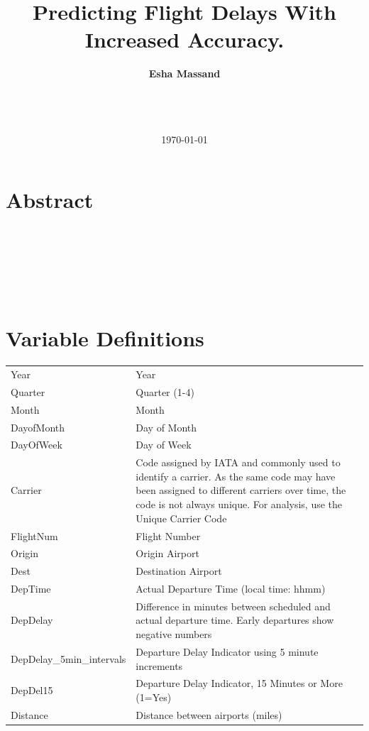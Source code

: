 \documentclass[a4paper, 11pt]{article}
\begin{document}
\LARGE\title{Predicting Flight Delays With Increased Accuracy.}

\LARGE\author{\textbf{Esha Massand}\\
\date{\mydate\today}
\\\
}

\normalsize


\maketitle


\section*{Abstract}
\begin{justify}

\end{justify}
\begin{verbatim}






\end{verbatim}


\clearpage
\tableofcontents
\clearpage

\section{Variable Definitions}\label{variables}

\begin{tabular}{l p{11cm}  }
Year& Year\\
Quarter& Quarter (1-4)\\
Month& Month\\
DayofMonth& Day of Month\\
DayOfWeek& Day of Week\\
Carrier& Code assigned by IATA and commonly used to identify a carrier. As the same code may have been assigned to different carriers over time, the code is not always unique. For analysis, use the Unique Carrier Code\\
FlightNum& Flight Number\\
Origin& Origin Airport\\
Dest& Destination Airport\\
DepTime& Actual Departure Time (local time: hhmm)\\
DepDelay& Difference in minutes between scheduled and actual departure time. Early departures show negative numbers\\
DepDelay\_5min\_intervals & Departure Delay Indicator using 5 minute increments\\
DepDel15& Departure Delay Indicator, 15 Minutes or More (1=Yes)\\
Distance& Distance between airports (miles)\\
\end{tabular}
\end{document}
